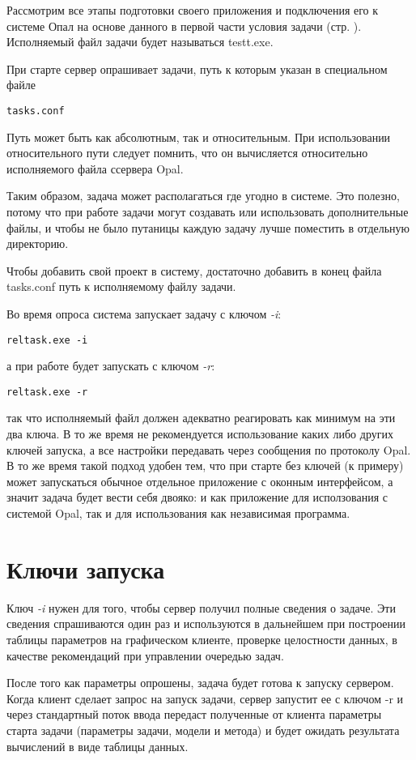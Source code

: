 Рассмотрим все этапы подготовки своего приложения и подключения его к системе Опал на основе данного в первой части условия задачи (стр. \pageref{testtask}). Исполняемый файл задачи будет называться testt.exe.

При старте сервер опрашивает задачи, путь к которым указан в специальном файле
\begin{verbatim}
tasks.conf
\end{verbatim}
Путь может быть как абсолютным, так и относительным. При использовании относительного пути следует помнить, что он вычисляется относительно исполняемого файла ссервера Opal. 

Таким образом, задача может располагаться где угодно в системе. Это полезно, потому что при работе задачи могут создавать или использовать дополнительные файлы, и чтобы не было путаницы каждую задачу лучше поместить в отдельную директорию.

Чтобы добавить свой проект в систему, достаточно добавить в конец файла tasks.conf путь к исполняемому файлу задачи. 

Во время опроса система запускает задачу с ключом \emph{-i}:
\begin{verbatim}
reltask.exe -i
\end{verbatim}
а при работе будет запускать с ключом \emph{-r}:
\begin{verbatim}
reltask.exe -r
\end{verbatim}
так что исполняемый файл должен адекватно реагировать как минимум на эти два ключа. В то же время не рекомендуется использование каких либо других ключей запуска, а все настройки передавать через сообщения по протоколу Opal. В то же время такой подход удобен тем, что при старте без ключей (к примеру) может запускаться обычное отдельное приложение с оконным интерфейсом, а значит задача будет вести себя двояко: и как приложение для исползования с системой Opal, так и для использования как независимая программа.

\section{Ключи запуска}

Ключ \emph{-i} нужен для того, чтобы сервер получил полные сведения о задаче. Эти сведения спрашиваются один раз и используются в дальнейшем при построении таблицы параметров на графическом клиенте, проверке целостности данных, в качестве рекомендаций при управлении очередью задач.

После того как параметры опрошены, задача будет готова к запуску сервером. Когда клиент сделает запрос на запуск задачи, сервер запустит ее с ключом -r и через стандартный поток ввода передаст полученные от клиента параметры старта задачи (параметры задачи, модели и метода) и будет ожидать результата вычислений в виде таблицы данных.

